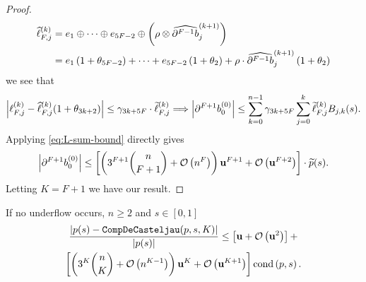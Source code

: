 \begin{proof}
\begin{align}
\widehat{\ell}_{F, j}^{(k)} &= e_1 \oplus \cdots \oplus e_{5F - 2} \oplus
\left(\rho \otimes \cdb{F - 1}_j^{(k + 1)}\right) \\
&= e_1\left(1 + \theta_{5F - 2}\right) + \cdots +
e_{5F - 2}\left(1 + \theta_2\right) +
\rho \cdot \cdb{F - 1}_j^{(k + 1)} \left(1 + \theta_2\right)
\end{align}
we see that
\begin{equation}
\left|\ell_{F, j}^{(k)} -
\widehat{\ell}_{F, j}^{(k)} (1 + \theta_{3k + 2})\right| \leq
\gamma_{3k + 5F} \cdot \widetilde{\ell}_{F, j}^{(k)}
\Longrightarrow
\left|\db{F + 1}_0^{(0)}\right| \leq \sum_{k = 0}^{n - 1}
\gamma_{3k + 5F} \sum_{j = 0}^k \widetilde{\ell}_{F, j}^{(k)} B_{j, k}(s).
\end{equation}
Applying \eqref{eq:L-sum-bound} directly gives
\begin{equation}
\left|\db{F + 1}_0^{(0)}\right| \leq
  \left[\left(3^{F + 1} \binom{n}{F + 1} + \bigO{n^F}\right)
  \mach^{F + 1} + \bigO{\mach^{F + 2}}\right] \cdot \widetilde{p}(s).
\end{equation}
Letting \(K = F + 1\) we have our result.
\end{proof}

\begin{theorem}
If no underflow occurs, \(n \geq 2\) and \(s \in \left[0, 1\right]\)
\begin{multline}
  \frac{\left|p(s) - \mathtt{CompDeCasteljau}(p, s, K)\right|}{
    \left|p(s)\right|} \leq \left[\mathbf{u} + \mathcal{O}\left(\mathbf{u}^2\right)
    \right] + \\
    \left[\left(3^{K} \binom{n}{K} + \mathcal{O}\left(n^{K - 1}\right)\right) \mathbf{u}^K +
    \mathcal{O}\left(\mathbf{u}^{K + 1}\right)\right] \operatorname{cond}\left(p, s\right).
\end{multline}
\end{theorem}

